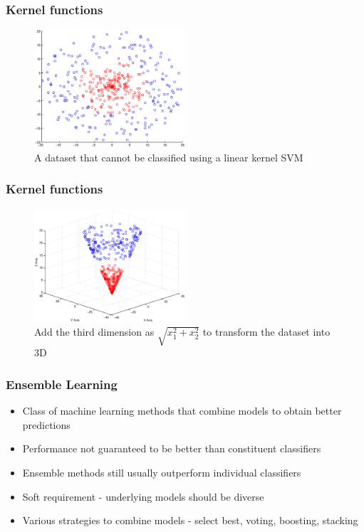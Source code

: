 \documentclass{beamer}
\begin{document}
    \begin{frame}
        \frametitle{Kernel functions}
        \begin{figure}
            \centering
            \includegraphics[width=0.5\textwidth]{figures/svm_non_linear_data.eps}
            \caption{A dataset that cannot be classified using a linear kernel SVM}
        \end{figure}
    \end{frame}
    
    \begin{frame}
        \frametitle{Kernel functions}
        \begin{figure}
            \centering
            \includegraphics[width=0.5\textwidth]{figures/svm_non_linear_data_3d.eps}
            \caption{Add the third dimension as $\sqrt{x_1^2 + x_2^2}$ to transform the dataset into 3D}
        \end{figure}
    \end{frame}
    
    \begin{frame}
        \frametitle{Ensemble Learning}
        \begin{itemize}
            \item{Class of machine learning methods that combine models to obtain better predictions}
            \item{Performance not guaranteed to be better than constituent classifiers}
            \item{Ensemble methods still usually outperform individual classifiers}
            \item{Soft requirement - underlying models should be diverse}
            \item{Various strategies to combine models - select best, voting, boosting, stacking}
        \end{itemize}
    \end{frame}
    
\end{document}
